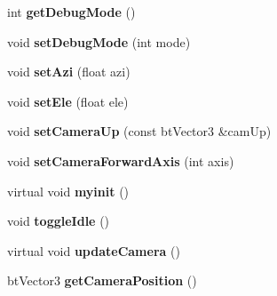\begin{DoxyCompactItemize}
\item 
\hypertarget{class_demo_application_aa499992e8a789530492d7d59958cbc43}{int {\bfseries get\+Debug\+Mode} ()}\label{class_demo_application_aa499992e8a789530492d7d59958cbc43}

\item 
\hypertarget{class_demo_application_a647dcde744e322d588ed5859221da260}{void {\bfseries set\+Debug\+Mode} (int mode)}\label{class_demo_application_a647dcde744e322d588ed5859221da260}

\item 
\hypertarget{class_demo_application_aa5b71f28a1d764ff2130460cafe16f0c}{void {\bfseries set\+Azi} (float azi)}\label{class_demo_application_aa5b71f28a1d764ff2130460cafe16f0c}

\item 
\hypertarget{class_demo_application_a635b70bc29fcf6904abd755aff69a750}{void {\bfseries set\+Ele} (float ele)}\label{class_demo_application_a635b70bc29fcf6904abd755aff69a750}

\item 
\hypertarget{class_demo_application_a8e783143ef5b61f6cb7bf99ff08c7c10}{void {\bfseries set\+Camera\+Up} (const bt\+Vector3 \&cam\+Up)}\label{class_demo_application_a8e783143ef5b61f6cb7bf99ff08c7c10}

\item 
\hypertarget{class_demo_application_ae3af19130405a204a0c562b872f662d4}{void {\bfseries set\+Camera\+Forward\+Axis} (int axis)}\label{class_demo_application_ae3af19130405a204a0c562b872f662d4}

\item 
\hypertarget{class_demo_application_ab3900d63e967d515d831d4070dee738e}{virtual void {\bfseries myinit} ()}\label{class_demo_application_ab3900d63e967d515d831d4070dee738e}

\item 
\hypertarget{class_demo_application_a043eaafa33ac8ca0c12d6cc3f541069e}{void {\bfseries toggle\+Idle} ()}\label{class_demo_application_a043eaafa33ac8ca0c12d6cc3f541069e}

\item 
\hypertarget{class_demo_application_aea586ac9d1ab04fe9cc92d5d103ec6b5}{virtual void {\bfseries update\+Camera} ()}\label{class_demo_application_aea586ac9d1ab04fe9cc92d5d103ec6b5}

\item 
\hypertarget{class_demo_application_ad9f0eec430829ba5fa9ab18972c88842}{bt\+Vector3 {\bfseries get\+Camera\+Position} ()}\label{class_demo_application_ad9f0eec430829ba5fa9ab18972c88842}


\end{DoxyCompactItemize}
